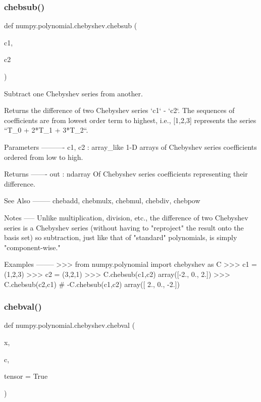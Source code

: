 \subsubsection{\texorpdfstring{chebsub()}{chebsub()}}
{\footnotesize\ttfamily def numpy.\+polynomial.\+chebyshev.\+chebsub (\begin{DoxyParamCaption}\item[{}]{c1,  }\item[{}]{c2 }\end{DoxyParamCaption})}

\begin{DoxyVerb}Subtract one Chebyshev series from another.

Returns the difference of two Chebyshev series `c1` - `c2`.  The
sequences of coefficients are from lowest order term to highest, i.e.,
[1,2,3] represents the series ``T_0 + 2*T_1 + 3*T_2``.

Parameters
----------
c1, c2 : array_like
    1-D arrays of Chebyshev series coefficients ordered from low to
    high.

Returns
-------
out : ndarray
    Of Chebyshev series coefficients representing their difference.

See Also
--------
chebadd, chebmulx, chebmul, chebdiv, chebpow

Notes
-----
Unlike multiplication, division, etc., the difference of two Chebyshev
series is a Chebyshev series (without having to "reproject" the result
onto the basis set) so subtraction, just like that of "standard"
polynomials, is simply "component-wise."

Examples
--------
>>> from numpy.polynomial import chebyshev as C
>>> c1 = (1,2,3)
>>> c2 = (3,2,1)
>>> C.chebsub(c1,c2)
array([-2.,  0.,  2.])
>>> C.chebsub(c2,c1) # -C.chebsub(c1,c2)
array([ 2.,  0., -2.])\end{DoxyVerb}
 \mbox{\label{namespacenumpy_1_1polynomial_1_1chebyshev_a8c29a244f70afca7102faf8882e20902}} 
\subsubsection{\texorpdfstring{chebval()}{chebval()}}
{\footnotesize\ttfamily def numpy.\+polynomial.\+chebyshev.\+chebval (\begin{DoxyParamCaption}\item[{}]{x,  }\item[{}]{c,  }\item[{}]{tensor = {\ttfamily True} }\end{DoxyParamCaption})}

